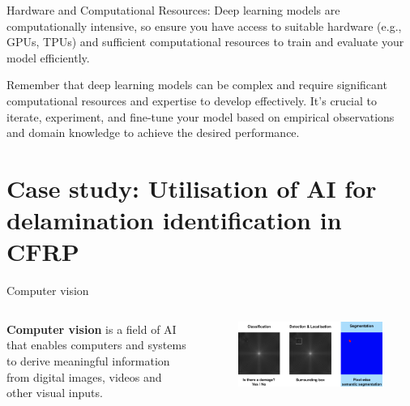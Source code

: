 \documentclass[10pt,aspectratio=169,dvipsnames]{beamer} %
\begin{document}
{		
		Hardware and Computational Resources: Deep learning models are computationally intensive, so ensure you have access to suitable hardware (e.g., GPUs, TPUs) and sufficient computational resources to train and evaluate your model efficiently.
		
		
		Remember that deep learning models can be complex and require significant computational resources and expertise to develop effectively. It's crucial to iterate, experiment, and fine-tune your model based on empirical observations and domain knowledge to achieve the desired performance.}
	\setcounter{subfigure}{0}
	\section{Case study: Utilisation of AI for delamination identification in CFRP
	}
	\setcounter{subfigure}{0}
	\begin{frame}{Computer vision}
		\begin{columns}[T]
			\begin{column}[c]{0.27\textwidth}
				\justifying
				\alert {\textbf{Computer vision}} is a field of AI that enables computers and systems to derive meaningful information from digital images, videos and other visual inputs. 
			\end{column}
			\quad
			\begin{column}[c]{0.7\textwidth}
				\begin{figure}
					\centering
					\includegraphics[width=1\textwidth]{computer_vision_tasks.png}
				\end{figure}
			\end{column}
		\end{columns}
	\end{frame}
\end{document}
